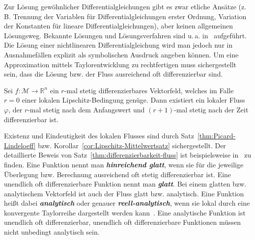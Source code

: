 Zur Lösung gewöhnlicher Differentialgleichungen gibt es zwar etliche
Ansätze (z.\,B. Trennung der Variablen für Differentialgleichungen
erster Ordnung, Variation der Konstanten für lineare Differentialgleichungen),
aber keinen allgemeinen Lösungsweg. Bekannte Lösungen und Lösungsverfahren
sind u.\,a. in~\cite{kamke1983,polianin2002} aufgeführt. Die Lösung
einer nichtlinearen Differentialgleichung wird man jedoch nur in Ausnahmefällen
explizit als symbolischen Ausdruck angeben können. Um eine Approximation
mittels Taylorentwicklung zu rechtfertigen muss sichergestellt sein,
dass die Lösung bzw. der Fluss ausreichend oft differenzierbar sind.
\begin{theorem}
\label{thm:differenzierbarkeit-fluss}Sei
$f:\mathcal{M}\to{\mathbb{R}}^{n}$ ein $r$-mal stetig differenzierbares Vektorfeld,
welches im Falle $r=0$ einer lokalen Lipschitz-Bedingung genüge.
Dann existiert ein lokaler Fluss~$\varphi$, der $r$-mal stetig
nach dem Anfangswert und $(r+1)$-mal stetig nach der Zeit differenzierbar
ist.
\end{theorem}
Existenz und Eindeutigkeit des lokalen Flusses sind durch Satz~\ref{thm:Picard-Lindeloeff}
bzw. Korollar~\ref{cor:Lipschitz-Mittelwertsatz} sichergestellt.
Der detaillierte Beweis von Satz~\ref{thm:differenzierbarkeit-fluss}
ist beispielsweise in~\cite{broecker1992,arnold2001,fischer2014band2}
zu finden. Eine Funktion nennt man \textbf{\em hinreichend glatt},
wenn sie für die jeweilige Überlegung bzw. Berechnung ausreichend
oft stetig differenzierbar ist. Eine unendlich oft differenzierbare
Funktion nennt man \textbf{\em glatt}. Bei einem glatten bzw. analytischem
Vektorfeld ist auch der Fluss glatt bzw. analytisch. Eine Funktion
heißt dabei \textbf{\em analytisch} oder genauer
\textbf{\em reell-analytisch}, wenn sie lokal durch eine konvergente Taylorreihe
dargestellt werden kann~\cite{koenigsberger2-2004}. Eine analytische
Funktion ist unendlich oft differenzierbar, unendlich oft differenzierbare
Funktionen müssen nicht unbedingt analytisch sein.

